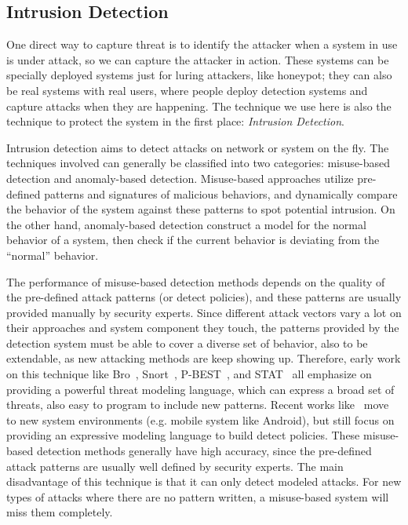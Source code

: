 \subsection{Intrusion Detection}

One direct way to capture threat is to identify the attacker when a
system in use is under attack, so we can capture the 
attacker in action. These systems can be specially deployed systems
just for luring attackers, like honeypot; they can also be real systems
with real users, where people deploy detection systems and capture 
attacks when they are happening. The technique we use here is also 
the technique to protect the system in the first place:
\textit{Intrusion Detection}.

Intrusion detection aims to detect attacks on network or system on the
fly. The techniques involved can generally be classified into two 
categories: misuse-based detection and anomaly-based detection.
Misuse-based approaches utilize pre-defined patterns and signatures
of malicious behaviors, and dynamically compare the behavior of the
system against these patterns to spot potential intrusion. On the other
hand, anomaly-based detection construct a model for the normal behavior 
of a system, then check if the current behavior is deviating from the 
``normal'' behavior.

The performance of misuse-based detection methods depends on the quality
of the pre-defined attack patterns (or detect policies), and these 
patterns are usually provided manually by security experts. Since 
different attack vectors vary a lot on their approaches and system 
component they touch, the 
patterns provided by the detection system must be able to cover a 
diverse set of behavior, also to be extendable, as new attacking
methods are keep showing up. Therefore, early work on this technique like
Bro~\cite{paxson1999bro}, Snort~\cite{roesch1999snort}, 
P-BEST~\cite{lindqvist1999detecting}, and STAT~\cite{vigna2003designing}
all emphasize on providing a powerful threat modeling language, which
can express a broad set of threats, also easy to program to include new 
patterns. Recent works like~\cite{bugiel2012towards} move to new
system environments (e.g. mobile system like Android), but still focus
on providing an expressive modeling language to build detect policies. 
These misuse-based detection methods generally have high accuracy, since the
pre-defined attack patterns are usually well defined by security experts. 
The main disadvantage of this technique is that it can only detect 
modeled attacks. For new types of attacks where there are no pattern
written, a misuse-based system will miss them completely.


